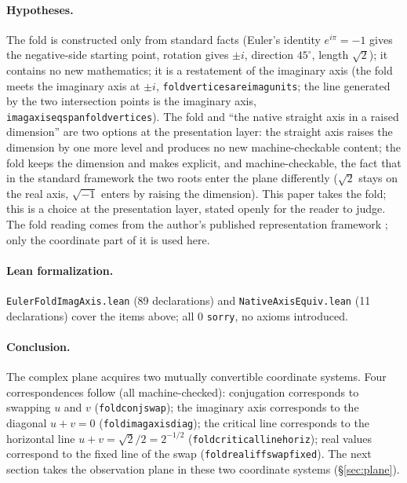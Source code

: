 \documentclass{article}
\renewcommand{\_}{\underscoreOrig\allowbreak}
\begin{document}
\paragraph{Hypotheses.} The fold is constructed only from standard facts
(Euler's identity $e^{i\pi}=-1$ gives the negative-side starting point,
rotation gives $\pm i$, direction $45^\circ$, length $\sqrt2$); it
contains no new mathematics; it is a restatement of the imaginary axis
(the fold meets the imaginary axis at $\pm i$,
\texttt{fold\_vertices\_are\_imag\_units}; the line generated by the two
intersection points is the imaginary axis,
\texttt{imag\_axis\_eq\_span\_fold\_vertices}). The fold and ``the native
straight axis in a raised dimension'' are two options at the presentation
layer: the straight axis raises the dimension by one more level and
produces no new machine-checkable content; the fold keeps the dimension
and makes explicit, and machine-checkable, the fact that in the standard
framework the two roots enter the plane differently ($\sqrt2$ stays on
the real axis, $\sqrt{-1}$ enters by raising the dimension). This paper
takes the fold; this is a choice at the presentation layer, stated openly
for the reader to judge. The fold reading comes from the author's
published representation framework \cite{zenodo, patbase}; only the
coordinate part of it is used here.

\paragraph{Lean formalization.} \texttt{EulerFoldImagAxis.lean}
(89 declarations) and \texttt{NativeAxisEquiv.lean} (11 declarations)
cover the items above; all 0 \texttt{sorry}, no axioms introduced.

\paragraph{Conclusion.} The complex plane acquires two mutually
convertible coordinate systems. Four correspondences follow (all
machine-checked): conjugation corresponds to swapping $u$ and $v$
(\texttt{fold\_conj\_swap}); the imaginary axis corresponds to the
diagonal $u+v=0$ (\texttt{fold\_imag\_axis\_diag}); the critical line
corresponds to the horizontal line $u+v=\sqrt2/2=2^{-1/2}$
(\texttt{fold\_critical\_line\_horiz}); real values correspond to the
fixed line of the swap (\texttt{fold\_real\_iff\_swap\_fixed}). The next
section takes the observation plane in these two coordinate systems
(\S\ref{sec:plane}).
\end{document}
